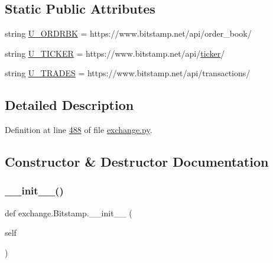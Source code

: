\subsection*{Static Public Attributes}
\begin{DoxyCompactItemize}
\item 
string \hyperlink{classexchange_1_1_bitstamp_ab83fdca31947f7b1a9ff6713945baec0}{U\+\_\+\+O\+R\+D\+R\+BK} = \textquotesingle{}https\+://www.\+bitstamp.\+net/api/order\+\_\+book/\textquotesingle{}
\item 
string \hyperlink{classexchange_1_1_bitstamp_ad8453cd76be07bef0001b642e110f981}{U\+\_\+\+T\+I\+C\+K\+ER} = \textquotesingle{}https\+://www.\+bitstamp.\+net/api/\hyperlink{classexchange_1_1_exchange_a7cf9e52f993627955a2e242c388daaeb}{ticker}/\textquotesingle{}
\item 
string \hyperlink{classexchange_1_1_bitstamp_a2424678b2c64d540ce9ecd0af2f96991}{U\+\_\+\+T\+R\+A\+D\+ES} = \textquotesingle{}https\+://www.\+bitstamp.\+net/api/transactions/\textquotesingle{}
\end{DoxyCompactItemize}


\subsection{Detailed Description}


Definition at line \hyperlink{exchange_8py_source_l00488}{488} of file \hyperlink{exchange_8py_source}{exchange.\+py}.



\subsection{Constructor \& Destructor Documentation}
\mbox{\label{classexchange_1_1_bitstamp_a22ae5a0f3c367bf4b9f8bb0bafbcd796}} 
\subsubsection{\texorpdfstring{\+\_\+\+\_\+init\+\_\+\+\_\+()}{\_\_init\_\_()}}
{\footnotesize\ttfamily def exchange.\+Bitstamp.\+\_\+\+\_\+init\+\_\+\+\_\+ (\begin{DoxyParamCaption}\item[{}]{self }\end{DoxyParamCaption})}




